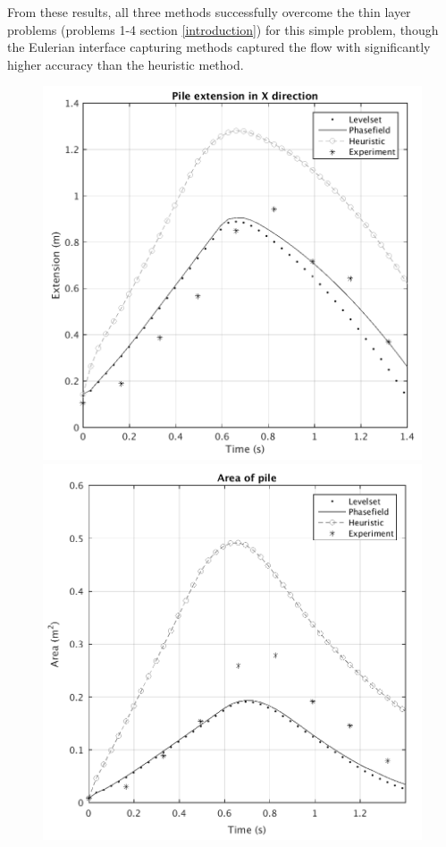 \documentclass[review]{elsarticle}
\begin{document}
From these results, all three methods successfully overcome the thin layer problems  (problems 1-4 section \ref{introduction}) for this simple problem, though
 the Eulerian interface capturing methods  captured the flow with significantly higher accuracy than the heuristic method.
\begin{figure}[H]
        \begin{minipage}[b]{.5\textwidth}
                \centering
                \includegraphics[width=1\textwidth]{IMAGES/xextend.png}
                  \label{x_extent}
                \includegraphics[width=1\textwidth]{IMAGES/area.png}

\end{minipage}
\end{figure}
\end{document}
